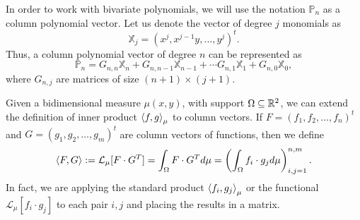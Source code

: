 \documentclass[portrait,final,a0paper,fontscale=0.38]{baposter}
\begin{document}
\begin{poster}
{\begin{multicols}{2}
  In order to work with bivariate polynomials, we will use the notation $\mathbb P_n$ as a column polynomial vector. Let us denote the vector of degree $j$ monomials as
  $$
  \mathbb{X}_j=(x^j, x^{j-1}y , \dots, y^j)^t.
  $$
  Thus, a column polynomial vector of degree $n$ can be represented as
  $$
  \mathbb{P}_n = G_{n,n}\mathbb{X}_n + G_{n,n-1}\mathbb{X}_{n-1}+\cdots G_{n,1}\mathbb{X}_1 + G_{n,0}\mathbb X_0,
  $$
  where $G_{n,j}$ are matrices of size $(n+1)\times(j+1)$. 

  Given a bidimensional measure $\mu(x,y)$, with support $\Omega\subseteq\mathbb{R}^2$, we can extend the definition of inner product $\left\langle f , g \right\rangle_\mu$ to column vectors. If $F=(f_1,f_2,\dots,f_n)^t$ and $G=(g_1,g_2,\dots, g_m)^t$ are column vectors of functions, then we define
  \begin{equation}
    \label{eq:prodesc-matrix}
    \left\langle F , G \right\rangle:=\mathcal{L}_\mu[F\cdot G^T] = \int_\Omega F\cdot G^T d\mu = \left(\int_\Omega f_i\cdot g_j d\mu\right)_{i,j=1}^{n,m}.
  \end{equation}
  In fact, we are applying the standard product $\left\langle f_i , g_j \right\rangle_\mu$ or the functional $\mathcal L_\mu[f_i\cdot g_j]$ to each pair $i,j$ and placing the results in a matrix.
  

\end{multicols}}
\end{poster}
\end{document}

